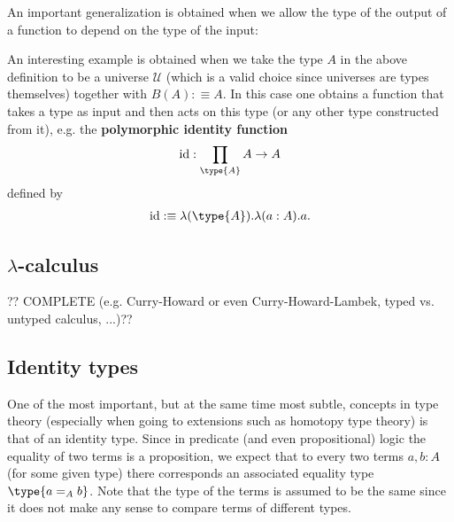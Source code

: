    An important generalization is obtained when we allow the type of the output of a function to depend on the type of the input:
    \begin{example}
        An interesting example is obtained when we take the type $A$ in the above definition to be a universe $\mathcal{U}$ (which is a valid choice since universes are types themselves) together with $B(A):\equiv A$. In this case one obtains a function that takes a type as input and then acts on this type (or any other type constructed from it), e.g. the \textbf{polymorphic identity function}
        \begin{gather}
            \text{id}:\prod_{\type{A}}A\rightarrow A
        \end{gather}
        defined by
        \begin{gather}
            \text{id}:\equiv\lambda(\type{A}).\lambda(a:A).a.
        \end{gather}
    \end{example}


\subsection{\texorpdfstring{$\lambda$-calculus}{Lambda-calculus}}

    ?? COMPLETE (e.g. Curry-Howard or even Curry-Howard-Lambek, typed vs. untyped calculus, ...)??

\subsection{Identity types}

    One of the most important, but at the same time most subtle, concepts in type theory (especially when going to extensions such as homotopy type theory) is that of an identity type. Since in predicate (and even propositional) logic the equality of two terms is a proposition, we expect that to every two terms $a,b:A$ (for some given type) there corresponds an associated equality type $\type{a=_Ab}$. Note that the type of the terms is assumed to be the same since it does not make any sense to compare terms of different types.

